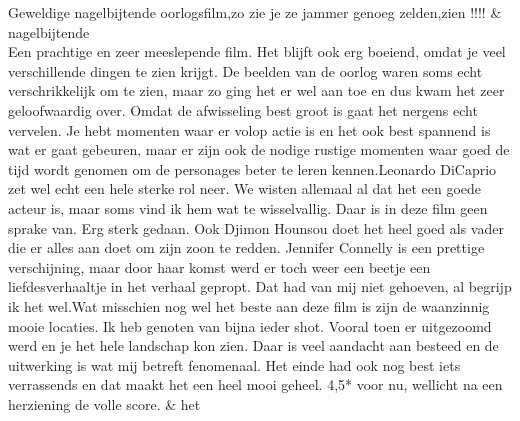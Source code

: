 \begin{appendices}
\begin{table}[]
\begin{tabu}
Geweldige nagelbijtende oorlogsfilm,zo zie je ze jammer genoeg zelden,zien !!!!                                                                                                                                                                                                                                                                                                                                                                                                                                                                                                                                                                                                                                                                                                                                                                                                                                                                                                                                                                                                                                                                                                                                                                                                                                                                                                                                                                                                                 & nagelbijtende                        \\ \hline
Een prachtige en zeer meeslepende film. Het blijft ook erg boeiend, omdat je veel verschillende dingen te zien krijgt. De beelden van de oorlog waren soms echt verschrikkelijk om te zien, maar zo ging het er wel aan toe en dus kwam het zeer geloofwaardig over. Omdat de afwisseling best groot is gaat het nergens echt vervelen. Je hebt momenten waar er volop actie is en het ook best spannend is wat er gaat gebeuren, maar er zijn ook de nodige rustige momenten waar goed de tijd wordt genomen om de personages beter te leren kennen.Leonardo DiCaprio zet wel echt een hele sterke rol neer. We wisten allemaal al dat het een goede acteur is, maar soms vind ik hem wat te wisselvallig. Daar is in deze film geen sprake van. Erg sterk gedaan. Ook Djimon Hounsou doet het heel goed als vader die er alles aan doet om zijn zoon te redden. Jennifer Connelly is een prettige verschijning, maar door haar komst werd er toch weer een beetje een liefdesverhaaltje in het verhaal gepropt. Dat had van mij niet gehoeven, al begrijp ik het wel.Wat misschien nog wel het beste aan deze film is zijn de waanzinnig mooie locaties. Ik heb genoten van bijna ieder shot. Vooral toen er uitgezoomd werd en je het hele landschap kon zien. Daar is veel aandacht aan besteed en de uitwerking is wat mij betreft fenomenaal. Het einde had ook nog best iets verrassends en dat maakt het een heel mooi geheel. 4,5* voor nu, wellicht na een herziening de volle score. & het                                  \\ \hline

\end{tabu}
\end{table}
\end{appendices}

